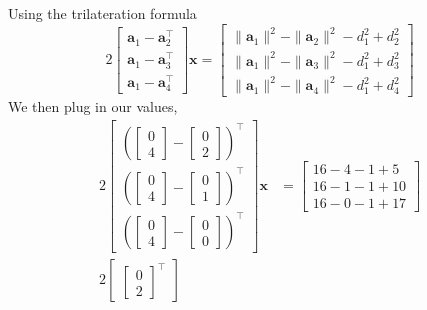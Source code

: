 \documentclass[]{article}
\newcommand{\tpose}[1]{#1^{\! \top} \!}
\begin{document}
Using the trilateration formula
\begin{equation}
	2\begin{bmatrix}
	\tpose{\bm{a}_1 - \bm{a}_2} \\
	\tpose{\bm{a}_1 - \bm{a}_3} \\
	\tpose{\bm{a}_1 - \bm{a}_4}
	\end{bmatrix} \bm{x}
	=
	\begin{bmatrix}
	\|\bm{a}_1\|^2 - \|\bm{a}_2\|^2 - d_1^2 + d_2^2 \\
	\|\bm{a}_1\|^2 - \|\bm{a}_3\|^2 - d_1^2 + d_3^2 \\
	\|\bm{a}_1\|^2 - \|\bm{a}_4\|^2 - d_1^2 + d_4^2
	\end{bmatrix}
\end{equation}
We then plug in our values,
\begin{align}
	2\begin{bmatrix}
	\tpose{\left(\begin{bmatrix}
		0 \\
		4
		\end{bmatrix}
		-
		\begin{bmatrix}
		0 \\
		2
		\end{bmatrix}\right)} \\
	\tpose{\left(\begin{bmatrix}
		0 \\
		4
		\end{bmatrix}
		-
		\begin{bmatrix}
		0 \\
		1
		\end{bmatrix}\right)} \\
	\tpose{\left(\begin{bmatrix}
		0 \\
		4
		\end{bmatrix}
		-
		\begin{bmatrix}
		0 \\
		0
		\end{bmatrix}\right)}
	\end{bmatrix} \bm{x}
	&=
	\begin{bmatrix}
	16 - 4 - 1 + 5 \\
	16 - 1 - 1 + 10 \\
	16 - 0 - 1 + 17
	\end{bmatrix} \\
	2\begin{bmatrix}
	\tpose{\begin{bmatrix}
		0 \\
		2

\end{bmatrix}}
\end{bmatrix}
\end{align}
\end{document}
